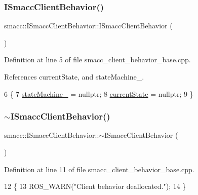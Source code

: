 \subsubsection{\texorpdfstring{I\+Smacc\+Client\+Behavior()}{ISmaccClientBehavior()}}
{\footnotesize\ttfamily smacc\+::\+I\+Smacc\+Client\+Behavior\+::\+I\+Smacc\+Client\+Behavior (\begin{DoxyParamCaption}{ }\end{DoxyParamCaption})}



Definition at line 5 of file smacc\+\_\+client\+\_\+behavior\+\_\+base.\+cpp.



References current\+State, and state\+Machine\+\_\+.


\begin{DoxyCode}
6 \{
7   \hyperlink{classsmacc_1_1ISmaccClientBehavior_a0fea65db292a8bb3dfba3e5840491d79}{stateMachine\_} = \textcolor{keyword}{nullptr};
8   \hyperlink{classsmacc_1_1ISmaccClientBehavior_a5a6658a2deb72b700ae595e594617616}{currentState} = \textcolor{keyword}{nullptr};
9 \}
\end{DoxyCode}
\mbox{\label{classsmacc_1_1ISmaccClientBehavior_a916a04c467ae5e98c5fc11909f0098f3}} 
\subsubsection{\texorpdfstring{$\sim$\+I\+Smacc\+Client\+Behavior()}{~ISmaccClientBehavior()}}
{\footnotesize\ttfamily smacc\+::\+I\+Smacc\+Client\+Behavior\+::$\sim$\+I\+Smacc\+Client\+Behavior (\begin{DoxyParamCaption}{ }\end{DoxyParamCaption})\hspace{0.3cm}{\ttfamily [virtual]}}



Definition at line 11 of file smacc\+\_\+client\+\_\+behavior\+\_\+base.\+cpp.


\begin{DoxyCode}
12 \{
13   ROS\_WARN(\textcolor{stringliteral}{"Client behavior deallocated."});
14 \}
\end{DoxyCode}


